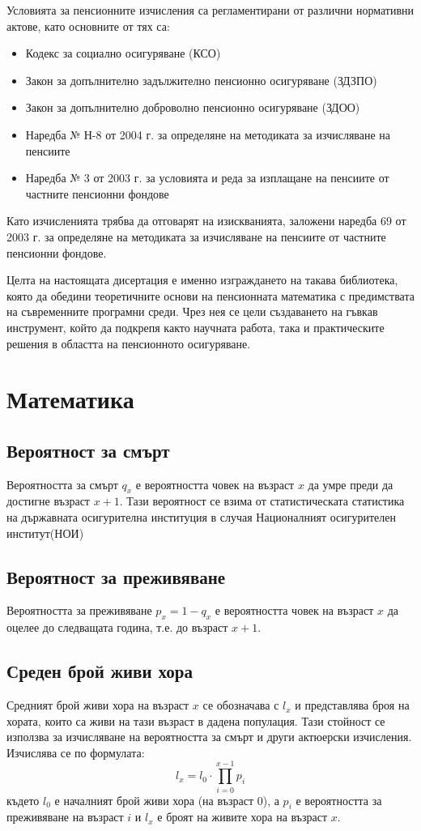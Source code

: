 \documentclass[a4paper,12pt]{article}
\begin{document}
Условията за пенсионните изчисления са регламентирани от различни нормативни актове, като основните от тях са:
\begin{itemize}
        \item Кодекс за социално осигуряване (КСО)
        \item Закон за допълнително задължително пенсионно осигуряване (ЗДЗПО)
        \item Закон за допълнително доброволно пенсионно осигуряване (ЗДОО)
        \item Наредба № Н-8 от 2004 г. за определяне на методиката за изчисляване на пенсиите
        \item Наредба № 3 от 2003 г. за условията и реда за изплащане на пенсиите от частните пенсионни фондове
\end{itemize}
Като изчисленията трябва да отговарят на изискванията, заложени наредба 69 от 2003 г. за определяне на методиката за изчисляване на пенсиите от частните пенсионни фондове. \cite{ZDZPO_2004,ZDOO_2000,DKFN_Pensions,NOI_Official}

Целта на настоящата дисертация е именно изграждането на такава библиотека, която да обедини теоретичните основи на пенсионната математика с предимствата на съвременните програмни среди. Чрез нея се цели създаването на гъвкав инструмент, който да подкрепя както научната работа, така и практическите решения в областта на пенсионното осигуряване.
\newpage
\section{Математика}
\subsection{Вероятност за смърт}
Вероятността за смърт $q_x$ е вероятността човек на възраст $x$ да умре преди да достигне възраст $x+1$. Тази вероятност се взима от статистическата статистика на държавната осигурителна институция  в случая Националният осигурителен институт(НОИ)
\subsection{Вероятност за преживяване}
Вероятността за преживяване $p_x= 1-q_x$ е вероятността човек на възраст $x$ да оцелее до следващата година, т.е. до възраст $x+1$.
\subsection{Среден брой живи хора}
Средният брой живи хора на възраст $x$ се обозначава с $l_x$ и представлява броя на хората, които са живи на тази възраст в дадена популация. Тази стойност се използва за изчисляване на вероятността за смърт и други актюерски изчисления. Изчислява се по формулата:
\[l_{x} = l_0 \cdot \prod_{i=0}^{x-1} p_i\]
където $l_0$ е началният брой живи хора (на възраст 0), а $p_i$ е вероятността за преживяване на възраст $i$ и $l_x$ е броят на живите хора на възраст $x$.
\end{document}
